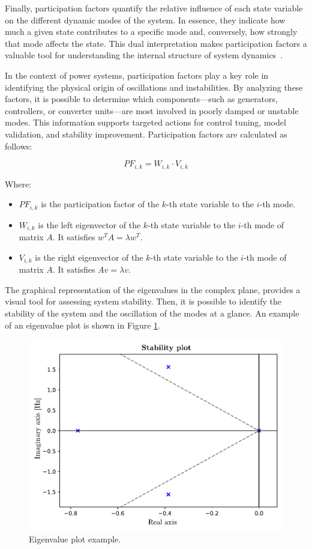 Finally, participation factors quantify the relative influence of each state variable on the different dynamic modes of the system. In essence,
they indicate how much a given state contributes to a specific mode and, conversely, how strongly that mode affects the state.
This dual interpretation makes participation factors a valuable tool for understanding the internal structure of system dynamics~\cite{KonovaPF}.

In the context of power systems, participation factors play a key role in identifying the physical origin of oscillations and instabilities.
By analyzing these factors, it is possible to determine which components—such as generators, controllers, or converter units—are most involved in poorly damped or unstable modes.
This information supports targeted actions for control tuning, model validation, and stability improvement. Participation factors are calculated as follows:

\begin{equation}
PF_{i,k} = W_{i,k} \cdot V_{i,k}
\end{equation}

Where:
\begin{itemize}
  \item $PF_{i,k}$ is the participation factor of the $k$-th state variable to the $i$-th mode.
  \item $W_{i,k}$ is the left eigenvector of the $k$-th state variable to the $i$-th mode of matrix $A$. It satisfies $w^T A = \lambda w^T$.
  \item $V_{i,k}$ is the right eigenvector of the $k$-th state variable to the $i$-th mode of matrix $A$. It satisfies $A v= \lambda v$.
\end{itemize}

The graphical representation of the eigenvalues in the complex plane, provides a visual tool for assessing system stability. Then, it is possible to identify
the stability of the system and the oscillation of the modes at a glance. An example of an eigenvalue plot is shown in Figure \ref{fig:eigenvalues_plot_example}.

\begin{figure}[H]
  \centering
  \includegraphics[width=0.8\linewidth]{inkscape_svg/eigenvalues_plot_example.pdf}
  \caption{Eigenvalue plot example.}
  \label{fig:eigenvalues_plot_example}
\end{figure}

